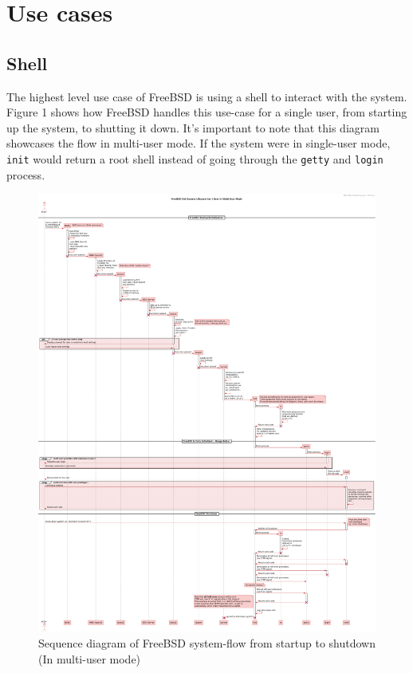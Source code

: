 \documentclass[12pt, dvipsnames, a4paper]{article}
\newcommand{\code}[1]{\texttt{#1}}
\begin{document}
\clearpage
\section{Use cases}
\subsection{Shell}
The highest level use case of FreeBSD is using a shell to interact with the system.
Figure 1 shows how FreeBSD handles this use-case for a single user,
from starting up the system, to shutting it down. It's important to note that
this diagram showcases the flow in multi-user mode. If the system were in
single-user mode, \code{init} would return a root shell instead of going through the
\code{getty} and \code{login} process\cite{bootprocess}\cite{init}.

\begin{figure}[!htb]
	\advance\leftskip-0.5cm
	\includegraphics[width = 570pt]{assets/sequence_diagrams/system-flow.pdf}
	\caption{Sequence diagram of FreeBSD system-flow from startup to shutdown (In multi-user mode) \cite{bootprocess}\cite{init}\cite{getty}\cite{login}}
\end{figure}
\clearpage
\end{document}
